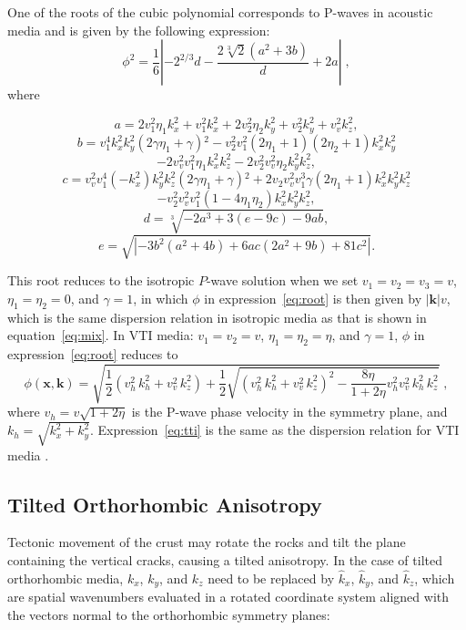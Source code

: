 One of the roots of the cubic polynomial corresponds to P-waves in acoustic media and is given by the following expression:
\begin{equation}
  \label{eq:root}
\phi^2=\frac{1}{6}\left|-2^{2/3}d -\frac{2 \sqrt[3]{2} \left(a^2+3 b\right)}{d}+2 a\right|\;,
\end{equation}
where

$$a=2 v_1^2 \eta _1 k_x^2+v_1^2 k_x^2+2 v_2^2 \eta _2 k_y^2+v_2^2k_y^2+v_v^2 k_z^2,$$
$$b=v_1^4 k_x^2 k_y^2 \left(2 \gamma \eta _1+\gamma \right){}^2-v_2^2
v_1^2 \left(2 \eta _1+1\right) \left(2 \eta _2+1\right) k_x^2 k_y^2$$
$$-2
v_v^2 v_1^2 \eta _1 k_x^2 k_z^2-2 v_2^2 v_v^2 \eta _2 k_y^2 k_z^2,$$
$$c=v_v^2 v_1^4 \left(-k_x^2\right) k_y^2 k_z^2 \left(2 \gamma \eta_1+\gamma \right){}^2+2 v_2 v_v^2 v_1^3 \gamma \left(2 \eta_1+1\right) k_x^2 k_y^2 k_z^2$$
$$-v_2^2 v_v^2 v_1^2 \left(1-4 \eta _1 \eta_2\right) k_x^2 k_y^2 k_z^2,$$
$$d=\sqrt[3]{-2 a^3+3 \left(e-9 c\right)-9
a b},$$
$$e=\sqrt{|-3 b^2\left(a^2+4 b\right)+6 a c \left(2 a^2+9 b\right)+81 c^2|}.$$


This root reduces to the isotropic $P$-wave solution 
when we set $v_1=v_2=v_3=v$, $\eta_1=\eta_2=0$, and $\gamma=1$, 
in which $\phi$ in expression~\ref{eq:root} is then given by $|\mathbf{k}|v$, which is the same dispersion relation in isotropic media as that is shown in equation~\ref{eq:mix}. 
In VTI media: 
$v_1=v_2=v$, $\eta_1=\eta_2=\eta$, and $\gamma=1$, 
$\phi$ in expression~\ref{eq:root} reduces to
\begin{equation}
\label{eq:tti} 
\phi(\mathbf{x},\mathbf{k})=\sqrt{\frac{1}{2}(v_h^2\,{k}_h^2+v_v^2\,{k}_z^2)+\frac{1}{2}\sqrt{(v_h^2\,{k}_h^2+v_v^2\,k_z^2)^2-\frac{8\eta}{1+2\eta}v_h^2v_v^2\,k_h^2\,k_z^2}}\;, 
\end{equation} 
where $v_h=v \sqrt{1+2\eta}$ is the P-wave phase velocity in the symmetry plane,
and ${k}_h=\sqrt{{k}_x^2+{k}_y^2}$. 
Expression~\ref{eq:tti} is the same as the dispersion relation for VTI media \cite[]{alkhalifah1,alkhalifah2,anelliptic}.
\\


\subsection{Tilted Orthorhombic Anisotropy}

Tectonic movement of the crust may rotate the
rocks and tilt the plane containing the vertical cracks,
causing a tilted anisotropy.
In the case of tilted orthorhombic media,
$k_x$, $k_y$, and $k_z$ need to be replaced 
by $\hat{k}_x$, $\hat{k}_y$, and $\hat{k}_z$, 
which are spatial wavenumbers evaluated in a rotated coordinate system aligned with the vectors normal to the orthorhombic symmetry planes:

